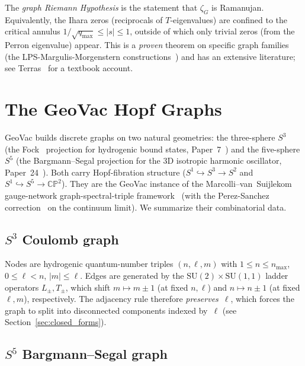 \documentclass[11pt]{article}
\begin{document}
The \emph{graph Riemann Hypothesis} is the statement that $\zeta_G$ is
Ramanujan.  Equivalently, the Ihara zeros (reciprocals of $T$-eigenvalues)
are confined to the critical annulus
$1/\sqrt{q_{\max}} \le |s| \le 1$, outside of which only trivial zeros
(from the Perron eigenvalue) appear.  This is a \emph{proven}
theorem on specific graph families (the LPS-Margulis-Morgenstern
constructions~\cite{lps1988,morgenstern1994}) and has an extensive
literature; see Terras~\cite{terras2010} for a textbook account.

\section{The GeoVac Hopf Graphs}
\label{sec:graphs}

GeoVac builds discrete graphs on two natural geometries: the
three-sphere $S^3$ (the Fock~\cite{fock1935} projection for hydrogenic
bound states, Paper~7~\cite{paper7}) and the five-sphere $S^5$ (the
Bargmann--Segal projection for the 3D isotropic harmonic oscillator,
Paper~24~\cite{paper24}).  Both carry Hopf-fibration structure
($S^1\hookrightarrow S^3\to S^2$ and $S^1\hookrightarrow S^5\to
\mathbb{CP}^2$).  They are the GeoVac instance of the
Marcolli--van~Suijlekom gauge-network graph-spectral-triple
framework~\cite{marcolli_vs2014} (with the Perez-Sanchez
correction~\cite{perez_sanchez2025} on the continuum
limit).  We summarize their combinatorial data.

\subsection{$S^3$ Coulomb graph}

Nodes are hydrogenic quantum-number triples $(n,\ell,m)$ with
$1\le n\le n_{\max}$, $0\le\ell<n$, $|m|\le\ell$.  Edges are generated
by the $\mathrm{SU}(2)\times\mathrm{SU}(1,1)$ ladder operators
$L_\pm, T_\pm$, which shift $m\mapsto m\pm 1$ (at fixed $n,\ell$) and
$n\mapsto n\pm 1$ (at fixed $\ell,m$), respectively.  The adjacency
rule therefore \emph{preserves}~$\ell$, which forces the graph to split
into disconnected components indexed by~$\ell$ (see
Section~\ref{sec:closed_forms}).

\subsection{$S^5$ Bargmann--Segal graph}
\end{document}
